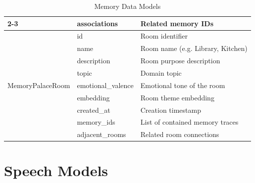 \documentclass[12pt,a4paper,twoside]{report}
\begin{document}
\begin{table}[H]
\begin{tabularx}{\textwidth}{|l|l|X|}
\cline{2-3}
 & associations & Related memory IDs \\
\hline
\multirow{9}{*}{MemoryPalaceRoom} & id & Room identifier \\
\cline{2-3}
 & name & Room name (e.g. Library, Kitchen) \\
\cline{2-3}
 & description & Room purpose description \\
\cline{2-3}
 & topic & Domain topic \\
\cline{2-3}
 & emotional\_valence & Emotional tone of the room \\
\cline{2-3}
 & embedding & Room theme embedding \\
\cline{2-3}
 & created\_at & Creation timestamp \\
\cline{2-3}
 & memory\_ids & List of contained memory traces \\
\cline{2-3}
 & adjacent\_rooms & Related room connections \\
\hline
\end{tabularx}
\caption{Memory Data Models}
\end{table}

\section{Speech Models}
\end{document}
